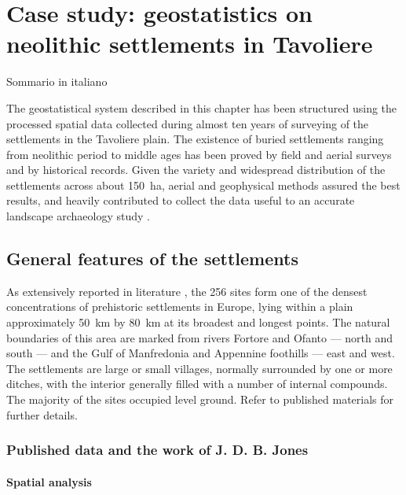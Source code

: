 \chapter{Case study: geostatistics on neolithic settlements in Tavoliere}

    \begin{chaptersum}
        Sommario in italiano
    \end{chaptersum}

    The geostatistical system described in this chapter has been structured using the processed spatial data collected during almost ten years of surveying of the settlements in the Tavoliere plain. The existence of buried settlements ranging from neolithic period to middle ages has been proved by field and aerial surveys and by historical records. Given the variety and widespread distribution of the settlements across about \SI{150}{\hectare}, aerial and geophysical methods assured the best results, and heavily contributed to collect the data useful to an accurate landscape archaeology study \cite[pp.~45--48]{remote-ciminale}.

    \section{General features of the settlements}
        As extensively reported in literature \cite{intro-tavoliere}, the 256 sites form one of the densest concentrations of prehistoric settlements in Europe, lying within a plain approximately \SI{50}{\kilo\meter} by \SI{80}{\kilo\meter} at its broadest and longest points. The natural boundaries of this area are marked from rivers Fortore and Ofanto --- north and south --- and the Gulf of Manfredonia and Appennine foothills --- east and west.\\
        The settlements are large or small villages, normally surrounded by one or more ditches, with the interior generally filled with a number of internal compounds. The majority of the sites occupied level ground. Refer to published materials for further details.

        \subsection{Published data and the work of J. D. B. Jones}

            \subsubsection{Spatial analysis}

